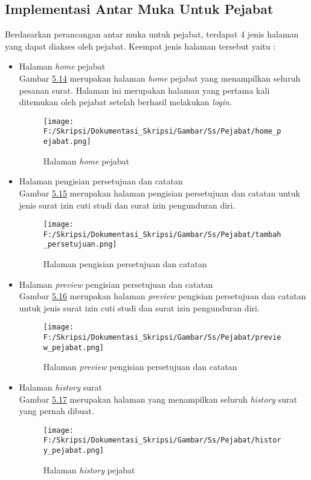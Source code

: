 \subsection{Implementasi Antar Muka Untuk Pejabat}
\label{sec:implementasi_antar_muka_pejabat}
Berdasarkan perancangan antar muka untuk pejabat, terdapat 4 jenis halaman yang dapat diakses oleh pejabat. Keempat jenis halaman tersebut yaitu :
\begin{itemize}
	\item Halaman \textit{home} pejabat\\
	 Gambar \hyperlink{halaman_home_pejabat}{5.14} merupakan halaman \textit{home} pejabat yang menampilkan seluruh pesanan surat. Halaman ini merupakan halaman yang pertama kali ditemukan oleh pejabat setelah berhasil melakukan \textit{login}.
	 \begin{figure}[H]
	\centering
		\texttt{[image: F:/Skripsi/Dokumentasi\_Skripsi/Gambar/Ss/Pejabat/home\_pejabat.png]}
		\caption{Halaman \textit{home} pejabat}
		\label{fig:halaman_home_pejabat}
	\end{figure}
	
	\item Halaman pengisian persetujuan dan catatan\\
	 Gambar \hyperlink{halaman_persetujuan_dan_catatan}{5.15} merupakan halaman pengisian persetujuan dan catatan untuk jenis surat izin cuti studi dan surat izin pengunduran diri.
	 \begin{figure}[H]
	\centering
		\texttt{[image: F:/Skripsi/Dokumentasi\_Skripsi/Gambar/Ss/Pejabat/tambah\_persetujuan.png]}
		\caption{Halaman pengisian persetujuan dan catatan}
		\label{fig:halaman_persetujuan_dan_catatan}
	\end{figure}
	
	\item Halaman \textit{preview} pengisian persetujuan dan catatan\\
	 Gambar \hyperlink{halaman_preview_persetujuan_dan_catatan}{5.16} merupakan halaman \textit{preview} pengisian persetujuan dan catatan untuk jenis surat izin cuti studi dan surat izin pengunduran diri.
	 \begin{figure}[H]
	\centering
		\texttt{[image: F:/Skripsi/Dokumentasi\_Skripsi/Gambar/Ss/Pejabat/preview\_pejabat.png]}
		\caption{Halaman \textit{preview} pengisian persetujuan dan catatan}
		\label{fig:halaman_preview_persetujuan_dan_catatan}
	\end{figure}
	
	\item Halaman \textit{history} surat\\
	 Gambar \hyperlink{halaman_history_pejabat}{5.17} merupakan halaman yang menampilkan seluruh \textit{history} surat yang pernah dibuat.
	 \begin{figure}[H]
	\centering
		\texttt{[image: F:/Skripsi/Dokumentasi\_Skripsi/Gambar/Ss/Pejabat/history\_pejabat.png]}
		\caption{Halaman \textit{history} pejabat}
		\label{fig:halaman_history_pejabat}
	\end{figure}
\end{itemize}


